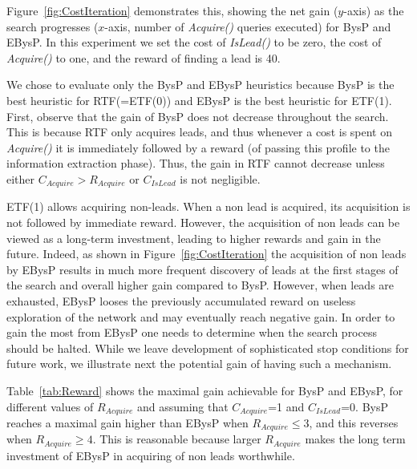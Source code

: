 \documentclass[prodmode,acmtecs]{acmsmall} %
\newcommand{\islead}[1]{{\em IsLead(#1)}}
\newcommand{\acquire}[1]{{\em Acquire(#1)}}
\begin{document}
Figure~\ref{fig:CostIteration} demonstrates this, showing the net gain ($y$-axis) as the search progresses ($x$-axis, number of \acquire{} queries executed) for BysP and EBysP. In this experiment we set the cost of \islead{} to be zero, the cost of \acquire{} to one, and the reward of finding a lead is 40.

We chose to evaluate only the BysP and EBysP heuristics because BysP is the best heuristic for RTF(=ETF(0)) and EBysP is the best heuristic for ETF(1). First, observe that the gain of BysP does not decrease throughout the search. This is because RTF only acquires leads, and thus whenever a cost is spent on \acquire{} it is immediately followed by a reward (of passing this profile to the information extraction phase). Thus, the gain in RTF cannot decrease unless either $C_{Acquire} > R_{Acquire}$ or $C_{IsLead}$ is not negligible.



ETF(1) allows acquiring non-leads. When a non lead is acquired, its acquisition
is not followed by immediate reward. However, the acquisition of non leads can
be viewed as a long-term investment, leading to higher rewards and gain in the
future. Indeed, as shown in Figure~\ref{fig:CostIteration} the acquisition of
non leads by EBysP results in much more frequent discovery of leads at the
first stages of the search and overall higher gain compared to BysP.
However, when leads are exhausted, EBysP looses the previously accumulated
reward on useless exploration of the network and may eventually reach negative
gain. In order to gain the most from EBysP one needs to determine when the
search process should be halted. While we leave development of sophisticated
stop conditions for future work, we illustrate next the potential gain of having
such a mechanism.

  


Table~\ref{tab:Reward} shows the maximal gain achievable for BysP and EBysP, for different values of $R_{Acquire}$ and assuming that $C_{Acquire}$=1 and $C_{IsLead}$=0. 
BysP reaches a maximal gain higher than EBysP when \(R_{Acquire} \leq 3 \), and this reverses when $R_{Acquire}\geq 4$. This is reasonable because larger $R_{Acquire}$ makes the long term investment of EBysP in
acquiring of non leads worthwhile.
\end{document}
